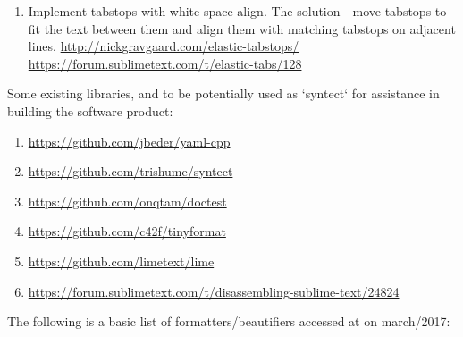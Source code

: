 \medskip
\begin{bluebox}
\begin{enumerate}[leftmargin=*]

    \item Implement tabstops with white space align. The solution - move
    tabstops to fit the text between them and align them with matching tabstops
    on adjacent lines. \url{http://nickgravgaard.com/elastic-tabstops/}
    \url{https://forum.sublimetext.com/t/elastic-tabs/128}

\end{enumerate}
\end{bluebox}

Some existing libraries,
and to be potentially used as `syntect` for assistance in building the software product:

\begin{bluebox}
\begin{enumerate}[leftmargin=*,parsep=0pt]

    \item \url{https://github.com/jbeder/yaml-cpp}
    \item \url{https://github.com/trishume/syntect}
    \item \url{https://github.com/onqtam/doctest}
    \item \url{https://github.com/c42f/tinyformat}
    \item \url{https://github.com/limetext/lime}
    \item \url{https://forum.sublimetext.com/t/disassembling-sublime-text/24824}

\end{enumerate}
\end{bluebox}

The following is a basic list of formatters/beautifiers accessed at
 on march/2017:


